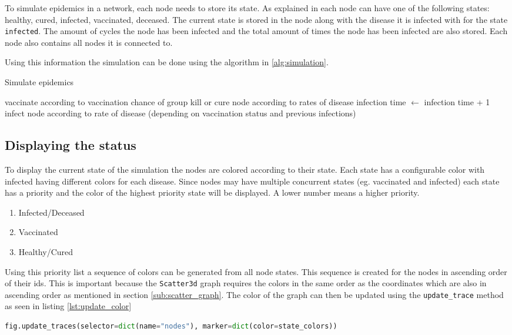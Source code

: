 To simulate epidemics in a network, each node needs to store its state. As explained in %
each node can have one of the following states: healthy, cured, infected, vaccinated, deceased. The current state is stored in the node along with the disease it is infected with for the state \texttt{infected}. The amount of cycles the node has been infected and the total amount of times the node has been infected are also stored. Each node also contains all nodes it is connected to.

Using this information the simulation can be done using the algorithm in \ref{alg:simulation}.

\begin{algorithm}
\caption{Simulate epidemics}
\label{alg:simulation}
\begin{algorithmic}
        \State vaccinate according to vaccination chance of group
    \EndIf
            \State kill or cure node according to rates of disease
        \Else
            \State infection time $\gets$ infection time + 1
                \State infect node according to rate of disease 
                \State (depending on vaccination status and previous infections)
            \EndFor
        \EndIf
    \EndIf
\EndFor
\end{algorithmic}
\end{algorithm}

\subsection{Displaying the status}
To display the current state of the simulation the nodes are colored according to their state. Each state has a configurable color with infected having different colors for each disease. Since nodes may have multiple concurrent states (eg. vaccinated and infected) each state has a priority and the color of the highest priority state will be displayed. A lower number means a higher priority.
\begin{enumerate}
    \item Infected/Deceased
    \item Vaccinated
    \item Healthy/Cured
\end{enumerate}

Using this priority list a sequence of colors can be generated from all node states. This sequence is created for the nodes in ascending order of their ids. This is important because the \texttt{Scatter3d} graph requires the colors in the same order as the coordinates which are also in ascending order as mentioned in section \ref{sub:scatter_graph}. The color of the graph can then be updated using the \texttt{update\_trace} method as seen in listing \ref{lst:update_color}

\begin{lstlisting}[language=python, caption={Updating the colors of the graph}, label={lst:update_color}]
fig.update_traces(selector=dict(name="nodes"), marker=dict(color=state_colors))
\end{lstlisting}